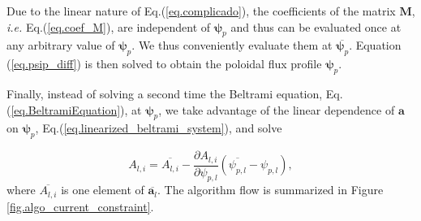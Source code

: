 Due to the linear nature of Eq.(\ref{eq.complicado}), the coefficients of the matrix $\mathbf{M}$, \textit{i.e.} Eq.(\ref{eq.coef_M}), are independent of $\bm{\psi}_p$ and thus can be evaluated once at any arbitrary value of $\bm{\psi}_p$. We thus conveniently evaluate them at $\overbar{\bm{\psi}_p}$. Equation (\ref{eq.psip_diff}) is then solved to obtain the poloidal flux profile $\bm{\psi}_p$. 

Finally, instead of solving a second time the Beltrami equation, Eq.(\ref{eq.BeltramiEquation}), at $\bm{\psi}_p$, we take advantage of the linear dependence of $\mathbf{a}$ on $\bm{\psi}_p$, Eq.(\ref{eq.linearized_beltrami_system}), and solve  

\begin{equation}
    A_{l,i} = \overbar{A_{l,i}} - \frac{\partial {A_{l,i}}}{\partial {\psi_{p,l}}} (\overbar{\psi_{p,l}} - \psi_{p,l}),\label{eq.NewtonStep_Solution}
\end{equation}
where $\overbar{A_{l,i}}$ is one element of $\overbar{\bm{a}_l}$. The algorithm flow is summarized in Figure \ref{fig.algo_current_constraint}.

